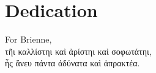 \documentclass[./dissertation.tex]{subfiles}
\begin{document}
  \chapter*{Dedication}

  For Brienne, \\
  \textgreek{τῆι καλλίστηι καὶ ἀρίστηι καὶ σοφωτάτηι,\\
  ἧς ἄνευ πάντα ἀδύνατα καὶ ἀπρακτέα.}
\end{document}

